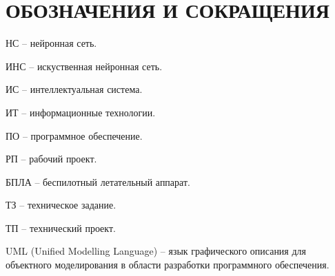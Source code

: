 \section*{ОБОЗНАЧЕНИЯ И СОКРАЩЕНИЯ}

НС -- нейронная сеть.

ИНС -- искуственная нейронная сеть.

ИС -- интеллектуальная система.

ИТ -- информационные технологии. 

ПО -- программное обеспечение.

РП -- рабочий проект.

БПЛА -- беспилотный летательный аппарат.

ТЗ -- техническое задание.

ТП -- технический проект.

UML (Unified Modelling Language) -- язык графического описания для объектного моделирования в области разработки программного обеспечения.
